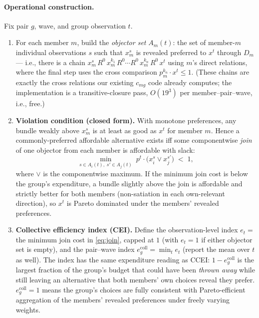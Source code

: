 \documentclass[11pt]{article}
\theoremstyle{remark}
\begin{document}
\paragraph{Operational construction.}
Fix pair $g$, wave, and group observation $t$.
\begin{enumerate}[leftmargin=1.6em]
\item For each member $m$, build the \emph{objector set} $A_m(t)$: the set of member-$m$ individual observations $s$ such that $x^s_m$ is revealed preferred to $x^t$ through $D_m$ --- i.e., there is a chain $x^s_m\,R^0\,x^{k_1}_m\,R^0\cdots R^0\,x^{k_n}_m\,R^0\,x^t$ using $m$'s direct relations, where the final step uses the cross comparison $p^{k_n}_m\cdot x^t\le 1$. (These chains are exactly the cross relations our existing $c_{mg}$ code already computes; the implementation is a transitive-closure pass, $O(19^3)$ per member--pair--wave, i.e., free.)
\item \textbf{Violation condition (closed form).} With monotone preferences, any bundle weakly above $x^s_m$ is at least as good as $x^t$ for member $m$. Hence a commonly-preferred affordable alternative exists iff some componentwise \emph{join} of one objector from each member is affordable with slack:
\begin{equation}\label{eq:join}
\min_{s\in A_i(t),\; s'\in A_j(t)}\; p^t\cdot\bigl(x^s_i \vee x^{s'}_j\bigr)\;<\;1,
\end{equation}
where $\vee$ is the componentwise maximum. If the minimum join cost is below the group's expenditure, a bundle slightly above the join is affordable and strictly better for both members (non-satiation in each own-relevant direction), so $x^t$ is Pareto dominated under the members' revealed preferences.
\item \textbf{Collective efficiency index (CEI).} Define the observation-level index $e_t=$ the minimum join cost in \eqref{eq:join}, capped at $1$ (with $e_t=1$ if either objector set is empty), and the pair--wave index $e^{\mathrm{coll}}_g=\min_t e_t$ (report the mean over $t$ as well). The index has the same expenditure reading as CCEI: $1-e^{\mathrm{coll}}_g$ is the largest fraction of the group's budget that could have been \emph{thrown away} while still leaving an alternative that both members' own choices reveal they prefer. $e^{\mathrm{coll}}_g=1$ means the group's choices are fully consistent with Pareto-efficient aggregation of the members' revealed preferences under freely varying weights.
\end{enumerate}
\end{document}

